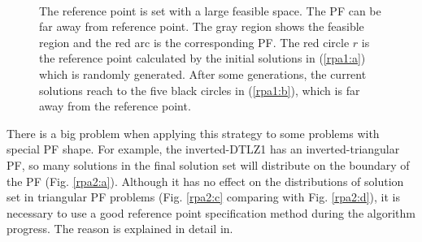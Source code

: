 \documentclass[conference]{IEEEtran}
\begin{document}
\begin{figure}[!t]
  \centering
  \quad
  \\
  \caption{The reference point is set with a large feasible space.
  The PF can be far away from reference point.
  The gray region shows the feasible region and the red arc is the corresponding PF.
  The red circle $r$ is the reference point calculated by the initial solutions in (\ref{rpa1:a})
  which is randomly generated.
  After some generations, the current solutions reach to the five black circles in (\ref{rpa1:b}), 
  which is far away from the reference point.}
  \label{rpa1}
\end{figure}

There is a big problem when applying this strategy to some problems with special PF shape. 
For example, the inverted-DTLZ1\cite{invertedDTLZ1} has an inverted-triangular PF, 
so many solutions in the final solution set will distribute on the boundary of the PF
(Fig. \ref{rpa2:a})\cite{hisao:RPexplanation, hisao:RPspecify, hisao:dynamic}. 
Although it has no effect on the distributions of solution set 
in triangular PF problems 
(Fig. \ref{rpa2:c} comparing with Fig. \ref{rpa2:d}), 
it is necessary to use a good reference point specification method during the algorithm progress.
The reason is explained in detail in\cite{hisao:RPexplanation}.
\end{document}

